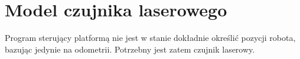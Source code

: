 \chapter{Model czujnika laserowego}
Program sterujący platformą nie jest w stanie dokładnie określić pozycji robota, bazując jedynie na odometrii.
Potrzebny jest zatem czujnik laserowy.
